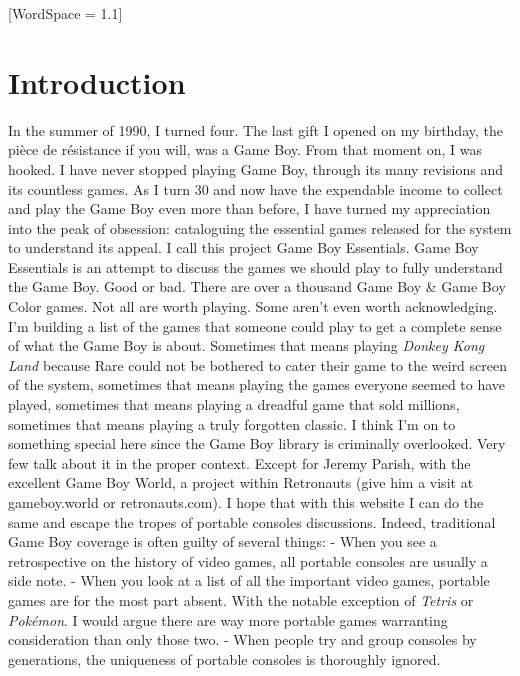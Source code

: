 \documentclass{book}
\begin{document}
\begingroup
\let\cleardoublepage\clearpage
\tableofcontents
\endgroup
\thispagestyle{empty}
[WordSpace = 1.1]
\fontsize{12pt}{12pt}\selectfont\begingroup \chapter*{Introduction} \endgroup
In the summer of 1990, I turned four. The last gift I opened on my birthday, the pièce de résistance if you will, was a Game Boy. From that moment on, I was hooked. I have never stopped playing Game Boy, through its many revisions and its countless games. As I turn 30 and now have the expendable income to collect and play the Game Boy even more than before, I have turned my appreciation into the peak of obsession: cataloguing the essential games released for the system to understand its appeal. I call this project Game Boy Essentials.
Game Boy Essentials is an attempt to discuss the games we should play to fully understand the Game Boy. Good or bad.
There are over a thousand Game Boy \& Game Boy Color games. Not all are worth playing. Some aren’t even worth acknowledging. I’m building a list of the games that someone could play to get a complete sense of what the Game Boy is about. Sometimes that means playing \emph{Donkey Kong Land} because Rare could not be bothered to cater their game to the weird screen of the system, sometimes that means playing the games everyone seemed to have played, sometimes that means playing a dreadful game that sold millions, sometimes that means playing a truly forgotten classic.
I think I’m on to something special here since the Game Boy library is criminally overlooked. Very few talk about it in the proper context. Except for Jeremy Parish, with the excellent Game Boy World, a project within Retronauts (give him a visit at gameboy.world or retronauts.com). I hope that with this website I can do the same and escape the tropes of portable consoles discussions. Indeed, traditional Game Boy coverage is often guilty of several things:
- When you see a retrospective on the history of video games, all portable consoles are usually a side note.
- When you look at a list of all the important video games, portable games are for the most part absent. With the notable exception of \emph{Tetris} or \emph{Pokémon}. I would argue there are way more portable games warranting consideration than only those two.
- When people try and group consoles by generations, the uniqueness of portable consoles is thoroughly ignored.
\end{document}
